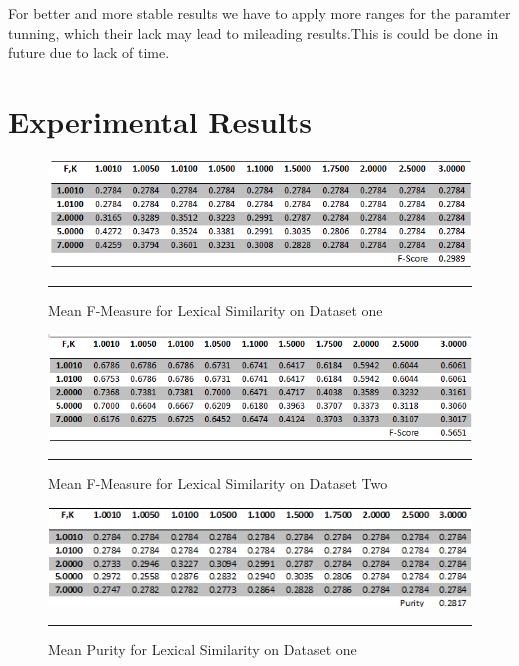 For better and more stable results we have to apply more ranges for the paramter tunning, which their lack may lead to mileading results.This is could be done in future due to lack of time.


\section{Experimental Results}
\label{tables}
\begin{figure}[htbp]
	\centering
		\includegraphics{./Figures/lexical_F_DS1.png}
		\rule{35em}{0.5pt}
	\caption[Mean F-Measure for Lexical Similarity on Dataset one]{Mean F-Measure for Lexical Similarity on Dataset one}
	\label{fig:purity1}
\end{figure}

\begin{figure}[htbp]
	\centering
		\includegraphics{./Figures/lexical_F_DS2.png}
		\rule{35em}{0.5pt}
	\caption[Mean F-Measure for Lexical Similarity on Dataset Two]{Mean F-Measure for Lexical Similarity on Dataset Two}
	\label{fig:purity2}
\end{figure}

\begin{figure}[htbp]
	\centering
		\includegraphics{./Figures/lexical_Purity_DS1.png}
		\rule{35em}{0.5pt}
	\caption[Mean Purity for Lexical Similarity on Dataset one]{Mean Purity for Lexical Similarity on Dataset one}
	\label{fig:purity3}
\end{figure}

